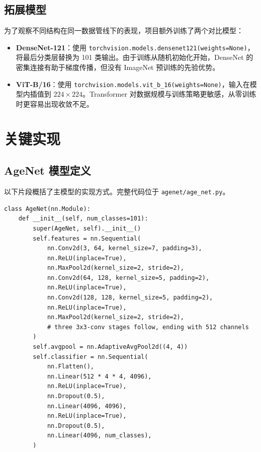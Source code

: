 \documentclass[12pt,a4paper,fontset=fandol]{ctexart}
\begin{document}
\subsection{拓展模型}

为了观察不同结构在同一数据管线下的表现，项目额外训练了两个对比模型：
\begin{itemize}
  \item \textbf{DenseNet-121}：使用 \texttt{torchvision.models.densenet121(weights=None)}，将最后分类层替换为 101 类输出。由于训练从随机初始化开始，DenseNet 的密集连接有助于梯度传播，但没有 ImageNet 预训练的先验优势。
  \item \textbf{ViT-B/16}：使用 \texttt{torchvision.models.vit\_b\_16(weights=None)}，输入在模型内插值到 $224\times224$。Transformer 对数据规模与训练策略更敏感，从零训练时更容易出现收敛不足。
\end{itemize}

\section{关键实现}

\subsection{AgeNet 模型定义}

以下片段概括了主模型的实现方式。完整代码位于 \texttt{agenet/age\_net.py}。

\begin{lstlisting}[caption={AgeNet 核心结构节选}]
class AgeNet(nn.Module):
    def __init__(self, num_classes=101):
        super(AgeNet, self).__init__()
        self.features = nn.Sequential(
            nn.Conv2d(3, 64, kernel_size=7, padding=3),
            nn.ReLU(inplace=True),
            nn.MaxPool2d(kernel_size=2, stride=2),
            nn.Conv2d(64, 128, kernel_size=5, padding=2),
            nn.ReLU(inplace=True),
            nn.Conv2d(128, 128, kernel_size=5, padding=2),
            nn.ReLU(inplace=True),
            nn.MaxPool2d(kernel_size=2, stride=2),
            # three 3x3-conv stages follow, ending with 512 channels
        )
        self.avgpool = nn.AdaptiveAvgPool2d((4, 4))
        self.classifier = nn.Sequential(
            nn.Flatten(),
            nn.Linear(512 * 4 * 4, 4096),
            nn.ReLU(inplace=True),
            nn.Dropout(0.5),
            nn.Linear(4096, 4096),
            nn.ReLU(inplace=True),
            nn.Dropout(0.5),
            nn.Linear(4096, num_classes),
        )
\end{lstlisting}
\end{document}
